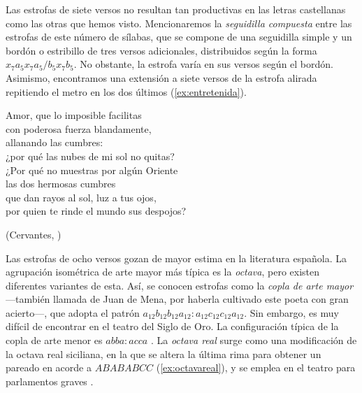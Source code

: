 Las estrofas de siete versos no resultan tan productivas en las letras castellanas como las otras que hemos visto. Mencionaremos la \textit{seguidilla compuesta} entre las estrofas de este número de sílabas, que se compone de una seguidilla simple y un bordón o estribillo de tres versos adicionales, distribuidos según la forma $x_{7}a_{5}x_{7}a_{5}/b_{5}x_{7}b_{5}$. No obstante, la estrofa varía en sus versos según el bordón. Asimismo, encontramos una extensión a siete versos de la estrofa alirada repitiendo el metro en los dos últimos (\ref{ex:entretenida}).
\begin{exe}
	\ex\label{ex:entretenida}Amor, que lo imposible facilitas\\	
	con poderosa fuerza blandamente,\\
	allanando las cumbres:\\
	¿por qué las nubes de mi sol no quitas?\\
	¿Por qué no muestras por algún Oriente\\	
	las dos hermosas cumbres\\
	que dan rayos al sol, luz a tus ojos,\\
	por quien te rinde el mundo sus despojos?\\
	\strut\hfill(Cervantes, )
\end{exe}

Las estrofas de ocho versos gozan de mayor estima en la literatura española. La agrupación isométrica de arte mayor más típica es la \textit{octava}, pero existen diferentes variantes de esta. Así, se conocen estrofas como la \textit{copla de arte mayor} —también llamada de Juan de Mena, por haberla cultivado este poeta con gran acierto—, que adopta el patrón $a_{12}b_{12}b_{12}a_{12}:a_{12}c_{12}c_{12}a_{12}$. Sin embargo, es muy difícil de encontrar en el teatro del Siglo de Oro. La configuración típica de la copla de arte menor es $abba:acca$ \parencite[266]{navarrotomas1991}. La \textit{octava real} surge como una modificación de la octava real siciliana, en la que se altera la última rima para obtener un pareado en acorde a $ABABABCC$ (\ref{ex:octavareal}), y se emplea en el teatro para parlamentos graves \parencites[252]{diazrengifo2012}[255]{navarrotomas1991}.



